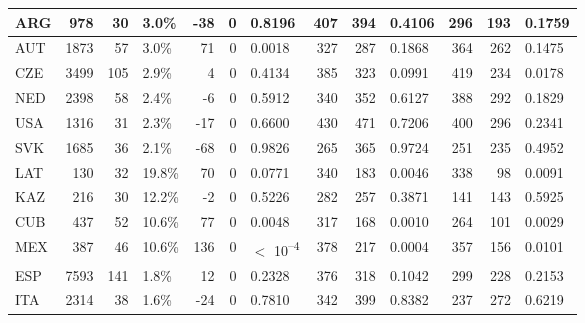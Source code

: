 \begin{tabular}{l|r|r|l|r|r|l|r|r|l|r|r|l}
\hline
ARG & 978 & 30 & 3.0\% & -38 & 0 & 0.8196 & 407 & 394 & 0.4106 & 296 & 193 & 0.1759\\
\hline
AUT & 1873 & 57 & 3.0\% & 71 & 0 & 0.0018 & 327 & 287 & 0.1868 & 364 & 262 & 0.1475\\
\hline
CZE & 3499 & 105 & 2.9\% & 4 & 0 & 0.4134 & 385 & 323 & 0.0991 & 419 & 234 & 0.0178\\
\hline
NED & 2398 & 58 & 2.4\% & -6 & 0 & 0.5912 & 340 & 352 & 0.6127 & 388 & 292 & 0.1829\\
\hline
USA & 1316 & 31 & 2.3\% & -17 & 0 & 0.6600 & 430 & 471 & 0.7206 & 400 & 296 & 0.2341\\
\hline
SVK & 1685 & 36 & 2.1\% & -68 & 0 & 0.9826 & 265 & 365 & 0.9724 & 251 & 235 & 0.4952\\
\hline
LAT & 130 & 32 & 19.8\% & 70 & 0 & 0.0771 & 340 & 183 & 0.0046 & 338 & 98 & 0.0091\\
\hline
KAZ & 216 & 30 & 12.2\% & -2 & 0 & 0.5226 & 282 & 257 & 0.3871 & 141 & 143 & 0.5925\\
\hline
CUB & 437 & 52 & 10.6\% & 77 & 0 & 0.0048 & 317 & 168 & 0.0010 & 264 & 101 & 0.0029\\
\hline
MEX & 387 & 46 & 10.6\% & 136 & 0 & $<$ 10\textsuperscript{--4} & 378 & 217 & 0.0004 & 357 & 156 & 0.0101\\
\hline
ESP & 7593 & 141 & 1.8\% & 12 & 0 & 0.2328 & 376 & 318 & 0.1042 & 299 & 228 & 0.2153\\
\hline
ITA & 2314 & 38 & 1.6\% & -24 & 0 & 0.7810 & 342 & 399 & 0.8382 & 237 & 272 & 0.6219\\
\hline
\end{tabular}

